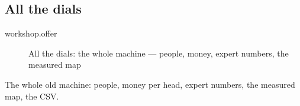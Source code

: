
\subsection{All the dials}\label{act:workshop}

\label{workshop}

\begin{description}
  \item[workshop.offer] All the dials: the whole machine — people, money, expert numbers, the measured map
\end{description}

The whole old machine: people, money per head, expert numbers, the measured
map, the CSV.
